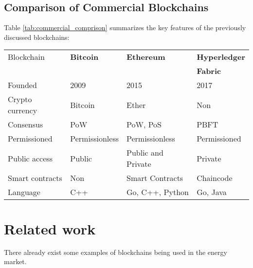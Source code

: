 \subsection{Comparison of Commercial Blockchains}
Table \ref{tab:commercial_comprison} summarizes the key features of the previously discussed blockchains: 
\begin{center}
\begin{tabular}{ l|l|l|l}
	 
	\label{tab:commercial_comprison}
   Blockchain  & \textbf{Bitcoin} & \textbf{Ethereum} & \textbf{Hyperledger} \\
    & & & \textbf{Fabric} \\ 
   \hline
   Founded & 2009 & 2015 & 2017 \\
   Crypto currency & Bitcoin & Ether & Non \\
   Consensus & PoW & PoW, PoS & PBFT \\
   Permissioned & Permissionless & Permissionless & Permissioned \\
   Public access & Public & Public and Private & Private \\
   Smart contracts & Non & Smart Contracts & Chaincode \\
   Language & C++ & Go, C++, Python & Go, Java \\

\end{tabular}
\end{center}


\section{Related work}
There already exist some examples of blockchains being used in the energy market.  

